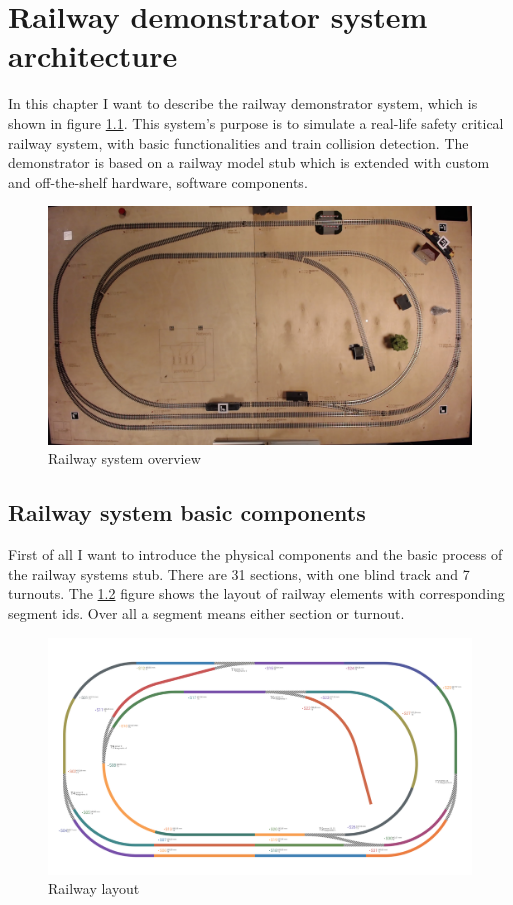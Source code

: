 
\chapter{Railway demonstrator system architecture}
In this chapter I want to describe the railway demonstrator system, which is shown in figure \ref{fig:overview}. This system's purpose is to simulate a real-life safety critical railway system, with basic functionalities and train collision detection. The demonstrator is based on a railway model stub which is extended with custom and off-the-shelf hardware, software components. 
\begin{figure}[h]
	\centering
	\includegraphics[width=150mm]{figures/modes3/overview.jpg}
	\caption{Railway system overview}
	\label{fig:overview}
\end{figure}

\section{Railway system basic components}
First of all I want to introduce the physical components and the basic process of the railway systems stub. There are 31 sections, with one blind track and 7 turnouts. The \ref{fig:layout} figure shows the layout of railway elements with corresponding segment ids. Over all a segment means either section or turnout.

\begin{figure}[h]
	\centering
	\includegraphics[width=150mm, keepaspectratio]{figures/modes3/layout2.png}
	\caption{Railway layout}
	\label{fig:layout}
\end{figure}

